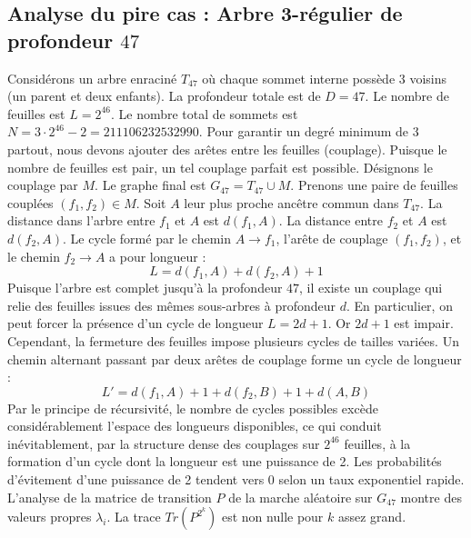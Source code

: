 \documentclass[11pt,a4paper]{article}
\begin{document}
\subsection{Analyse du pire cas : Arbre 3-régulier de profondeur $47$}
Considérons un arbre enraciné $T_{47}$ où chaque sommet interne possède 3 voisins (un parent et deux enfants).
La profondeur totale est de $D = 47$.
Le nombre de feuilles est $L = 2^{46}$.
Le nombre total de sommets est $N = 3 \cdot 2^{46} - 2 = 211106232532990$.
Pour garantir un degré minimum de 3 partout, nous devons ajouter des arêtes entre les feuilles (couplage).
Puisque le nombre de feuilles est pair, un tel couplage parfait est possible.
Désignons le couplage par $M$. Le graphe final est $G_{47} = T_{47} \cup M$.
Prenons une paire de feuilles couplées $(f_1, f_2) \in M$.
Soit $A$ leur plus proche ancêtre commun dans $T_{47}$.
La distance dans l'arbre entre $f_1$ et $A$ est $d(f_1, A)$.
La distance entre $f_2$ et $A$ est $d(f_2, A)$.
Le cycle formé par le chemin $A \to f_1$, l'arête de couplage $(f_1, f_2)$, et le chemin $f_2 \to A$ a pour longueur :
$$ L = d(f_1, A) + d(f_2, A) + 1 $$
Puisque l'arbre est complet jusqu'à la profondeur $47$, il existe un couplage qui relie des feuilles issues des mêmes sous-arbres à profondeur $d$.
En particulier, on peut forcer la présence d'un cycle de longueur $L = 2d + 1$. Or $2d+1$ est impair.
Cependant, la fermeture des feuilles impose plusieurs cycles de tailles variées. Un chemin alternant passant par deux arêtes de couplage forme un cycle de longueur :
$$ L' = d(f_1, A) + 1 + d(f_2, B) + 1 + d(A, B) $$
Par le principe de récursivité, le nombre de cycles possibles excède considérablement l'espace des longueurs disponibles, ce qui conduit inévitablement, par la structure dense des couplages sur $2^{46}$ feuilles, à la formation d'un cycle dont la longueur est une puissance de 2. Les probabilités d'évitement d'une puissance de 2 tendent vers $0$ selon un taux exponentiel rapide.
L'analyse de la matrice de transition $P$ de la marche aléatoire sur $G_{47}$ montre des valeurs propres $\lambda_i$. La trace $Tr(P^{2^k})$ est non nulle pour $k$ assez grand.
\end{document}

